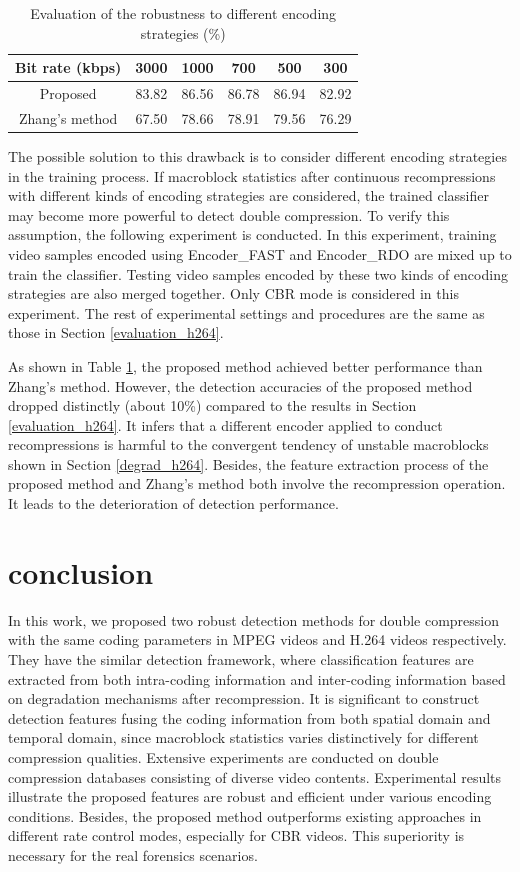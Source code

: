\documentclass[journal,sort]{IEEEtran}
\begin{document}
\begin{table}[htbp]
	\centering
	\caption{Evaluation of the robustness to different encoding strategies (\%)}
	\begin{tabular}{cccccc}
		\toprule
		Bit rate (kbps) & 3000  & 1000  & 700   & 500   & 300 \\
		\midrule
		Proposed & 83.82 & 86.56 & 86.78 & 86.94 & 82.92 \\
		Zhang's method & 67.50  & 78.66 & 78.91 & 79.56 & 76.29 \\
		\bottomrule
	\end{tabular}%
	\label{tab:rdo_sad}%
\end{table}%

The possible solution to this drawback is to consider different encoding strategies in the training process. If macroblock statistics after continuous recompressions with different kinds of encoding strategies are considered, the trained classifier may become more powerful to detect double compression. To verify this assumption, the following experiment is conducted. In this experiment, training video samples encoded using Encoder\_FAST and Encoder\_RDO are mixed up to train the classifier. Testing video samples encoded by these two kinds of encoding strategies are also merged together. Only CBR mode is considered in this experiment. The rest of experimental settings and procedures are the same as those in Section \ref{evaluation_h264}.

As shown in Table \ref{tab:rdo_sad}, the proposed method achieved better performance than Zhang's method. However, the detection accuracies of the proposed method dropped distinctly (about 10\%) compared to the results in Section \ref{evaluation_h264}. It infers that a different encoder applied to conduct recompressions is harmful to the convergent tendency of unstable macroblocks shown in Section \ref{degrad_h264}. Besides, the feature extraction process of the proposed method and Zhang's method both involve the recompression operation. It leads to the deterioration of detection performance.


\section{conclusion}
In this work, we proposed two robust detection methods for double compression with the same coding parameters in MPEG videos and H.264 videos respectively. They have the similar detection framework, where classification features are extracted from both intra-coding information and inter-coding information based on degradation mechanisms after recompression. It is significant to construct detection features fusing the coding information from both spatial domain and temporal domain, since macroblock statistics varies distinctively for different compression qualities. Extensive experiments are conducted on double compression databases consisting of diverse video contents.  Experimental results illustrate the proposed features are robust and efficient under various encoding conditions. Besides, the proposed method outperforms existing approaches in different rate control modes, especially for CBR videos. This superiority is necessary for the real forensics scenarios. 
\end{document}
